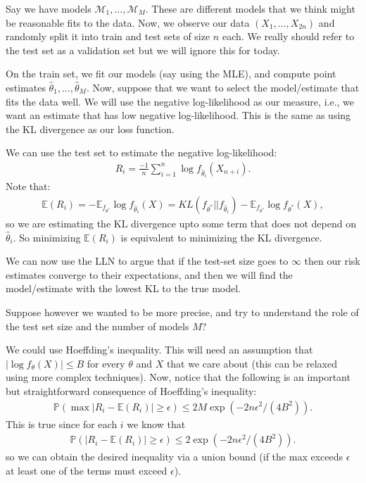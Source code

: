 \documentclass[twoside,12pt]{article}
\begin{document}
Say we have 
models $\mathcal{M}_1, \ldots, \mathcal{M}_M$. These are different models that we think might be reasonable fits to the data. Now, we observe our data $(X_1,\ldots,X_{2n})$ and randomly 
split it into train and test sets of size $n$ each. We really should refer to the test set as a validation set but we will ignore this for today. 

On the train set, we fit our models (say using the MLE), and compute point estimates $\widehat{\theta}_1,\ldots,\widehat{\theta}_M$. Now, suppose that we want to select the model/estimate that fits the
data well. We will use the negative log-likelihood as our measure, i.e., we want an estimate
that has low negative log-likelihood. This is the same as using the KL divergence as our loss function. 

We can use the test set to estimate the negative log-likelihood:
\begin{align*}
R_i = \frac{- 1}{n} \sum_{i=1}^n \log f_{\widehat{\theta}_i}(X_{n+i}).
\end{align*} 
Note that:
\begin{align*}
\mathbb{E}(R_i) =  - \mathbb{E}_{f_{\theta^*}} \log f_{\widehat{\theta}_i}(X) = KL ( f_{\theta^*} || f_{\widehat{\theta}_i}) -  \mathbb{E}_{f_{\theta^*}}\log f_{\theta^*}(X),
\end{align*}
so we are estimating the KL divergence upto some term that does not depend on $\widehat{\theta}_i$. So minimizing $\mathbb{E}(R_i)$ is equivalent to minimizing the KL divergence. 

We can now use the LLN to argue that if the test-set size goes to $\infty$ then our risk estimates converge to their expectations, and then we will find the model/estimate with the lowest KL to the true model.

Suppose however we wanted to be more precise, and try to understand the role of the test set size
and the number of models $M$?

We could use Hoeffding's inequality. This will need an assumption that $|\log f_{\theta}(X)| \leq B$
for every $\theta$ and $X$ that we care about (this can be relaxed using more complex techniques).
Now, notice that the following is an important but straightforward consequence of Hoeffding's inequality:
\begin{align*}
\mathbb{P}(\max | R_i - \mathbb{E} (R_i) | \geq \epsilon) \leq 2M \exp (-2n\epsilon^2/(4B^2)).
\end{align*}
This is true since for each $i$ we know that 
\begin{align*}
\mathbb{P}(| R_i - \mathbb{E} (R_i) | \geq \epsilon) \leq 2 \exp (-2n\epsilon^2/(4B^2)).
\end{align*}
so we can obtain the desired inequality via a union bound (if the max exceeds $\epsilon$ at least one 
of the terms must exceed $\epsilon$).
\end{document}
